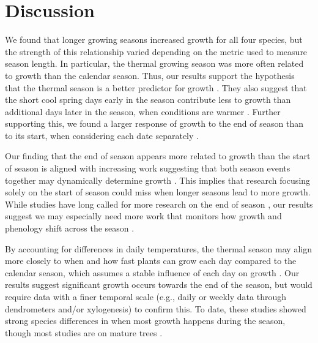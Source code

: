 \documentclass{article}\usepackage[]{graphicx}\usepackage[]{xcolor}
\begin{document}
\clearpage
\section{Discussion} 
We found that longer growing seasons increased growth for all four species, but the strength of this relationship varied depending on the metric used to measure season length. In particular, the thermal growing season was more often related to growth than the calendar season. Thus, our results support the hypothesis that the thermal season is a better predictor for growth \citep{chuine_processbased_2017,wang_simulation_1998}. They also suggest that the short cool spring days early in the season contribute less to growth than additional days later in the season, when conditions are warmer \citep{buonaiuto_early_2026}. Further supporting this, we found a larger response of growth to the end of season than to its start, when considering each date separately \citep{zhang_drought_2021}.

Our finding that the end of season appears more related to growth than the start of season is aligned with increasing work suggesting that both season events together may dynamically determine growth \citep{zohner_effect_2023}. This implies that research focusing solely on the start of season \citep{dow_warm_2022,gaoEarlierStartThermal2022,wheeler_snow_2016} could miss when longer seasons lead to more growth. While studies have long called for more research on the end of season \citep{gallinat_autumn_2015,gunderson_forest_2012,piao_plant_2019,richardson_terrestrial_2012}, our results suggest we may especially need more work that monitors how growth and phenology shift across the season \citep{zani_increased_2020,zohner_effect_2023}. 

By accounting for differences in daily temperatures, the thermal season may align more closely to when and how fast plants can grow each day compared to the calendar season, which assumes a stable influence of each day on growth \citep{korner_four_2023}. Our results suggest significant growth occurs towards the end of the season, but would require data with a finer temporal scale (e.g., daily or weekly data through dendrometers and/or xylogenesis) to confirm this. To date, these studies showed strong species differences in when most growth happens during the season, though most studies are on mature trees \citep[e.g.][]{zweifel_are_2016,etzold_number_2022,balducci_stem_2019}. 
\end{document}
